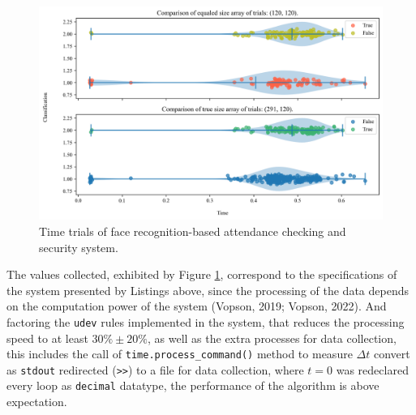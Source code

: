 \documentclass[12pt]{article}
\begin{document}
\begin{figure}[h!]
	\centering
	\includegraphics[width=\textwidth]{fig_1da.png}
	\caption{Time trials of face recognition-based attendance checking and security system.} \label{fig:9}
\end{figure}

The values collected, exhibited by Figure \ref{fig:9}, correspond to the specifications of the system presented by Listings above, since the processing of the data depends on the computation power of the system (Vopson, 2019; Vopson, 2022). And factoring the \texttt{udev} rules implemented in the system, that reduces the processing speed to at least $30\% \pm 20\%$, as well as the extra processes for data collection, this includes the call of \texttt{time.process\_command()} method to measure $\Delta t$ convert as \texttt{stdout} redirected (\texttt{>>}) to a file for data collection, where $t = 0$ was redeclared every loop as \texttt{decimal} datatype, the performance of the algorithm is above expectation.
\end{document}
